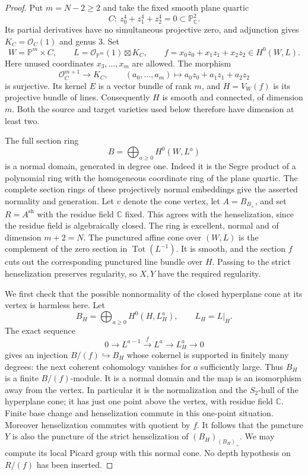 \begin{proof}
Put $m=N-2\ge2$ and take the fixed smooth plane quartic
\[
 C:\ z_0^4+z_1^4+z_2^4=0\subset\mathbb P^2_{\mathbb C}.
\]
Its partial derivatives have no simultaneous projective
zero, and adjunction gives $K_C=\mathcal O_C(1)$ and
genus $3$. Set
\[
 W=\mathbb P^m\times C,\qquad
 L=\mathcal O_{\mathbb P^m}(1)\boxtimes K_C,
 \qquad f=x_0z_0+x_1z_1+x_2z_2\in H^0(W,L).
\]
Here unused coordinates $x_3,\ldots,x_m$ are allowed.
The morphism
\[
 \mathcal O_C^{m+1}\longrightarrow K_C,
       \qquad (a_0,\ldots,a_m)\longmapsto
                         a_0z_0+a_1z_1+a_2z_2
\]
is surjective. Its kernel $E$ is a vector bundle of rank
$m$, and $H=V_W(f)$ is its projective bundle of lines.
Consequently $H$ is smooth and connected, of dimension
$m$. Both the source and target varieties used below
therefore have dimension at least two.

The full section ring
\[
 B=\bigoplus_{a\ge0}H^0(W,L^a)
\]
is a normal domain, generated in degree one. Indeed it
is the Segre product of a polynomial ring with the
homogeneous coordinate ring of the plane quartic.
The complete section rings of these projectively normal
embeddings give the asserted normality and generation.
Let $v$ denote the cone vertex, let
$A=B_{B_+}$, and set $R=A^{\mathrm{sh}}$ with the
residue field $\mathbb C$ fixed. This agrees with the
henselization, since the residue field is algebraically
closed. The ring is excellent, normal and of dimension
$m+2=N$. The punctured affine cone over $(W,L)$ is the
complement of the zero section in $\operatorname{Tot}(L^{-1})$.
It is smooth, and the section $f$ cuts out the corresponding
punctured line bundle over $H$. Passing to the strict
henselization preserves regularity, so $X,Y$ have the
required regularity.

We first check that the possible nonnormality of the
closed hyperplane cone at its vertex is harmless here.
Let
\[
 B_H=\bigoplus_{a\ge0}H^0(H,L_H^a),\qquad L_H=L|_H.
\]
The exact sequence
\[
 0\longrightarrow L^{a-1}\xrightarrow{\ f\ }L^a
        \longrightarrow L_H^a\longrightarrow0
\]
gives an injection $B/(f)\hookrightarrow B_H$ whose
cokernel is supported in finitely many degrees: the
next coherent cohomology vanishes for $a$ sufficiently
large. Thus $B_H$ is a finite $B/(f)$-module. It is a
normal domain and the map is an isomorphism away from
the vertex. In particular it is the normalization and
the $S_2$-hull of the hyperplane cone; it has just one
point above the vertex, with residue field $\mathbb C$.
Finite base change and henselization commute in this
one-point situation. Moreover henselization commutes
with quotient by $f$. It follows that the puncture
$Y$ is also the puncture of the strict henselization of
$(B_H)_{(B_H)_+}$. We may compute its local Picard group
with this normal cone. No depth hypothesis on $R/(f)$
has been inserted.


\end{proof}
